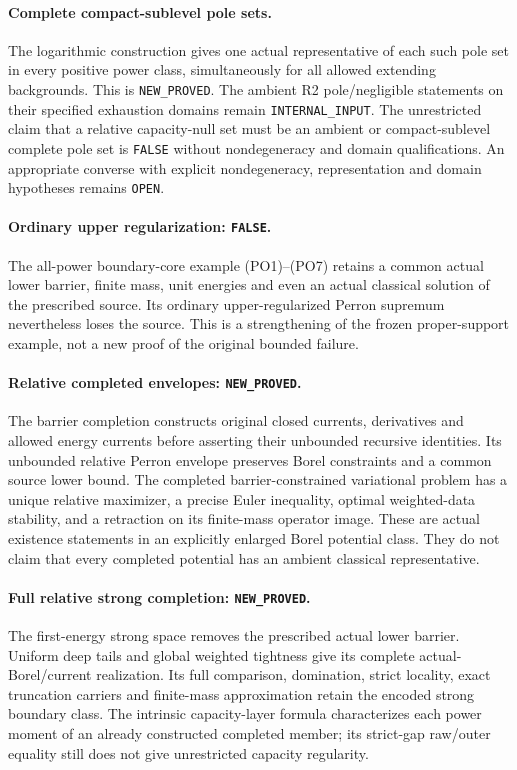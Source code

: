 \documentclass[11pt,a4paper]{article}
\numberwithin{equation}{section}
\theoremstyle{definition}
\theoremstyle{remark}
\begin{document}
\paragraph{Complete compact-sublevel pole sets.}
The logarithmic construction gives one actual
representative of each such pole set in every
positive power class, simultaneously for all
allowed extending backgrounds.
This is \texttt{NEW\_PROVED}.
The ambient R2 pole/negligible statements on
their specified exhaustion domains remain
\texttt{INTERNAL\_INPUT}.
The unrestricted claim that a relative
capacity-null set must be an ambient or
compact-sublevel complete pole set is
\texttt{FALSE} without nondegeneracy and
domain qualifications.
An appropriate converse with explicit
nondegeneracy, representation and domain
hypotheses remains \texttt{OPEN}.

\paragraph{Ordinary upper regularization: \texttt{FALSE}.}
The all-power boundary-core example (PO1)--(PO7)
retains a common actual lower barrier, finite
mass, unit energies and even an actual
classical solution of the prescribed source.
Its ordinary upper-regularized Perron
supremum nevertheless loses the source.
This is a strengthening of the frozen
proper-support example, not a new proof
of the original bounded failure.

\paragraph{Relative completed envelopes: \texttt{NEW\_PROVED}.}
The barrier completion constructs original
closed currents, derivatives and allowed
energy currents before asserting their
unbounded recursive identities.
Its unbounded relative Perron envelope
preserves Borel constraints and a common
source lower bound.
The completed barrier-constrained
variational problem has a unique relative
maximizer, a precise Euler inequality,
optimal weighted-data stability, and a
retraction on its finite-mass operator image.
These are actual existence statements in
an explicitly enlarged Borel potential
class.  They do not claim that every
completed potential has an ambient
classical representative.

\paragraph{Full relative strong completion: \texttt{NEW\_PROVED}.}
The first-energy strong space removes the prescribed actual
lower barrier. Uniform deep tails and global weighted tightness
give its complete actual-Borel/current realization. Its full
comparison, domination, strict locality, exact truncation
carriers and finite-mass approximation retain the encoded
strong boundary class. The intrinsic capacity-layer formula
characterizes each power moment of an already constructed
completed member; its strict-gap raw/outer equality still
does not give unrestricted capacity regularity.
\end{document}
